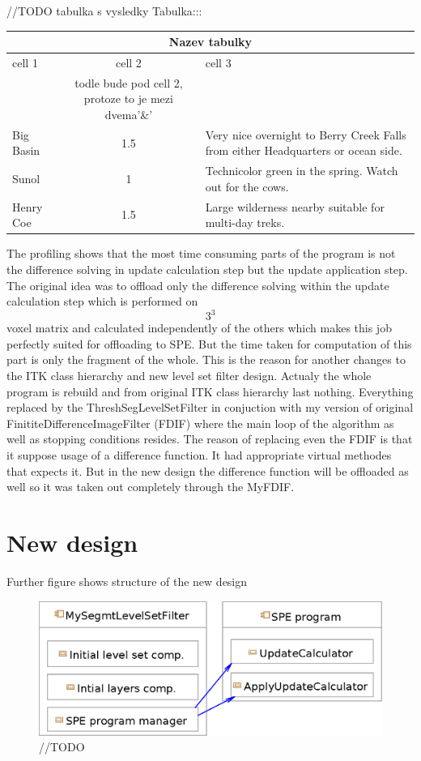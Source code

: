 //TODO tabulka s vysledky
Tabulka:::
\begin{center}
\begin{tabular}{|l|c|p{3.5in}|}
\hline
\multicolumn{3}{|c|}{Nazev tabulky}\\ 
\hline cell 1&cell 2&cell 3\\&todle bude pod cell 2, protoze to je mezi dvema'\&' &\\ 
\hline Big Basin&1.5&Very nice overnight to Berry Creek Falls from
either Headquarters or ocean side.\\ 
\hline Sunol&1&Technicolor green in the spring. Watch out for the cows.\\ 
\hline Henry Coe&1.5&Large wilderness nearby suitable for multi-day treks.\\ 
\hline
\end{tabular}
\end{center}

The profiling shows that the most time consuming parts of the program is not the difference solving in update calculation step but the update application step. The original idea was to offload only the difference solving within the update calculation step which is performed on $$3^3$$ voxel matrix and calculated independently of the others which makes this job perfectly suited for offloading to SPE. But the time taken for computation of this part is only the fragment of the whole. This is the reason for another changes to the ITK class hierarchy and new level set filter design. Actualy the whole program is rebuild and from original ITK class hierarchy last nothing. Everything replaced by the ThreshSegLevelSetFilter in conjuction with my version of original FinititeDifferenceImageFilter (FDIF) where the main loop of the algorithm as well as stopping conditions resides. The reason of replacing even the FDIF is that it suppose usage of a difference function. It had appropriate virtual methodes that expects it. But in the new design the difference function will be offloaded as well so it was taken out completely through the MyFDIF.

\section{New design}

Further figure shows structure of the new design

\begin{figure}
    \centering
    \includegraphics[width=15cm]{data/newDesign.eps}
    \caption[Diagram of new design components]{//TODO}
    \label{fg:newDesign}
\end{figure}

